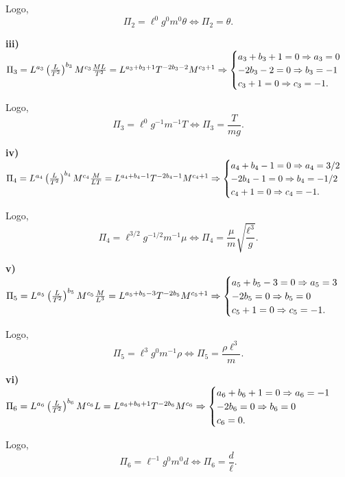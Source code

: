 Logo,
$$\Pi_2 = \ell^0 g^0 m^0 \theta \Leftrightarrow \Pi_2 = \theta.$$

\vspace{0.5cm}
\noindent \textbf{iii)} $\Pi_3 = L^{a_3} \left(\frac{L}{T^2}\right)^{b_3} M^{c_3} \frac{ML}{T^2} = L^{a_3+b_3+1} T^{-2b_3-2} M^{c_3+1} \\ \\ \Rightarrow \begin{cases} a_3 + b_3 + 1 = 0 \Rightarrow a_3 = 0 \\ -2b_3 - 2 = 0 \Rightarrow b_3 = -1 \\ c_3 + 1 = 0 \Rightarrow c_3 = -1. \end{cases}$

Logo,
$$\Pi_3 = \ell^0 g^{-1} m^{-1} T \Leftrightarrow \Pi_3 = \frac{T}{mg}.$$

\vspace{0.5cm}
\noindent \textbf{iv)} $\Pi_4 = L^{a_4} \left(\frac{L}{T^2}\right)^{b_4} M^{c_4} \frac{M}{LT} = L^{a_4+b_4-1} T^{-2b_4-1} M^{c_4+1} \\\\ \Rightarrow \begin{cases} a_4 + b_4 - 1 = 0 \Rightarrow a_4 = 3/2 \\ -2b_4 - 1 = 0 \Rightarrow b_4 = -1/2 \\ c_4 + 1 = 0 \Rightarrow c_4 = -1. \end{cases}$

Logo,
$$\Pi_4 = \ell^{3/2} g^{-1/2} m^{-1} \mu \Leftrightarrow \Pi_4 = \frac{\mu}{m} \sqrt{\frac{\ell^3}{g}}.$$

\vspace{0.5cm}
\noindent \textbf{v)} $\Pi_5 = L^{a_5} \left(\frac{L}{T^2}\right)^{b_5} M^{c_5} \frac{M}{L^3} = L^{a_5+b_5-3} T^{-2b_5} M^{c_5+1} \\ \\ \Rightarrow \begin{cases} a_5 + b_5 - 3 = 0 \Rightarrow a_5 = 3 \\ -2b_5 = 0 \Rightarrow b_5 = 0 \\ c_5 + 1 = 0 \Rightarrow c_5 = -1. \end{cases}$

Logo,
$$\Pi_5 = \ell^3 g^0 m^{-1} \rho \Leftrightarrow \Pi_5 = \frac{\rho \ell^3}{m}.$$

\vspace{0.5cm}
\noindent \textbf{vi)} $\Pi_6 = L^{a_6} \left(\frac{L}{T^2}\right)^{b_6} M^{c_6} L = L^{a_6+b_6+1} T^{-2b_6} M^{c_6} \\ \\ \Rightarrow \begin{cases} a_6 + b_6 + 1 = 0 \Rightarrow a_6 = -1 \\ -2b_6 = 0 \Rightarrow b_6 = 0 \\ c_6 = 0. \end{cases}$

Logo,
$$\Pi_6 = \ell^{-1} g^0 m^0 d \Leftrightarrow \Pi_6 = \frac{d}{\ell}.$$

%